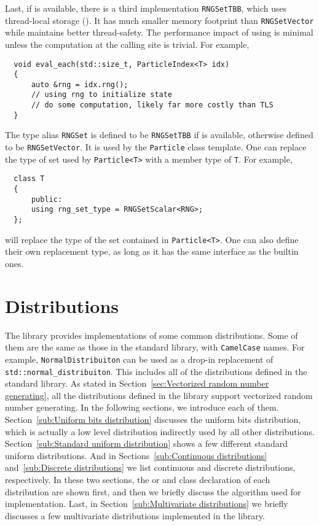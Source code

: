 Last, if \tbb is available, there is a third implementation \verb|RNGSetTBB|,
which uses thread-local storage (\tls). It has much smaller memory footprint
than \verb|RNGSetVector| while maintains better thread-safety. The performance
impact of using \tls is minimal unless the computation at the calling site is
trivial. For example,
\begin{Verbatim}
  void eval_each(std::size_t, ParticleIndex<T> idx)
  {
      auto &rng = idx.rng();
      // using rng to initialize state
      // do some computation, likely far more costly than TLS
  }
\end{Verbatim}
The type alias \verb|RNGSet| is defined to be \verb|RNGSetTBB| if \tbb is
available, otherwise defined to be \verb|RNGSetVector|. It is used by the
\verb|Particle| class template. One can replace the type of \rng set used by
\verb|Particle<T>| with a member type of \verb|T|. For example,
\begin{Verbatim}
  class T
  {
      public:
      using rng_set_type = RNGSetScalar<RNG>;
  };
\end{Verbatim}
will replace the type of the \rng set contained in \verb|Particle<T>|. One can
also define their own replacement type, as long as it has the same interface as
the builtin ones.

\section{Distributions}
\label{sec:Distributions}

The library provides implementations of some common distributions. Some of them
are the same as those in the standard library, with \verb|CamelCase| names. For
example, \verb|NormalDistribuiton| can be used as a drop-in replacement of
\verb|std::normal_distribuiton|. This includes all of the distributions defined
in the standard library. As stated in Section~\ref{sec:Vectorized random number
  generating}, all the distributions defined in the library support vectorized
random number generating. In the following sections, we introduce each
of them. Section~\ref{sub:Uniform bits distribution} discusses the uniform bits
distribution, which is actually a low level distribution indirectly used by all
other distributions. Section~\ref{sub:Standard uniform distribution} shows a
few different standard uniform distributions. And in
Sections~\ref{sub:Continuous distributions} and~\ref{sub:Discrete
  distributions} we list continuous and discrete distributions, respectively.
In these two sections, the \pdf or \pmf and class declaration of each
distribution are shown first, and then we briefly discuss the algorithm used
for implementation. Last, in Section~\ref{sub:Multivariate distributions} we
briefly discusses a few multivariate distributions implemented in the library.

